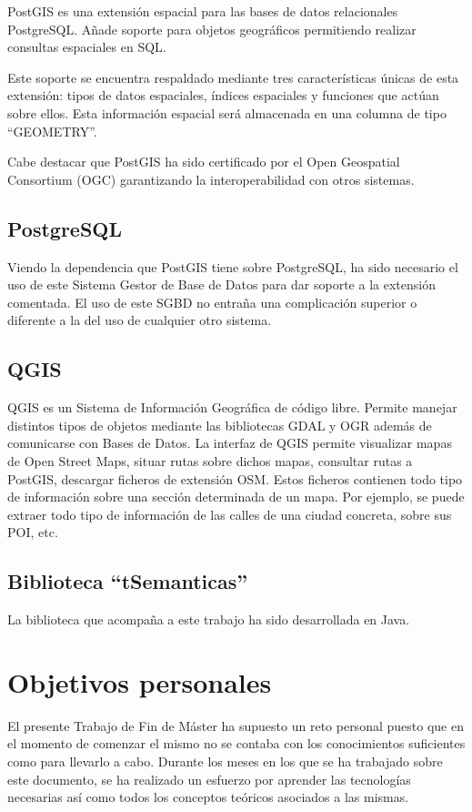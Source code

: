 PostGIS es una extensión espacial para las bases de datos relacionales PostgreSQL. Añade soporte  para objetos geográficos permitiendo realizar consultas espaciales en SQL.

Este soporte se encuentra respaldado mediante tres características únicas de esta extensión: tipos de datos espaciales, índices espaciales y funciones que actúan sobre ellos. Esta información espacial será almacenada en una columna de tipo ``GEOMETRY''.

Cabe destacar que PostGIS ha sido certificado por el Open Geospatial Consortium (OGC) garantizando la interoperabilidad con otros sistemas.


\subsection{PostgreSQL}
Viendo la dependencia que PostGIS tiene sobre PostgreSQL, ha sido necesario el uso de este Sistema Gestor de Base de Datos para dar soporte a la extensión comentada. El uso de este SGBD no entraña una complicación superior o diferente a la del uso de cualquier otro sistema.


\subsection{QGIS}
QGIS es un Sistema de Información Geográfica de código libre. Permite manejar distintos tipos de objetos mediante las bibliotecas GDAL y OGR además de comunicarse con Bases de Datos. La interfaz de QGIS permite visualizar mapas de Open Street Maps, situar rutas sobre dichos mapas, consultar rutas a PostGIS, descargar ficheros de  extensión OSM. Estos ficheros contienen todo tipo de información sobre una sección determinada de un mapa. Por ejemplo, se puede extraer todo tipo de información de las calles de una ciudad concreta, sobre sus POI, etc. 

\subsection{Biblioteca ``tSemanticas''}
La biblioteca que acompaña a este trabajo ha sido desarrollada en Java.

\section{Objetivos personales}

El presente Trabajo de Fin de Máster ha supuesto un reto personal puesto que en el momento de comenzar el mismo no se contaba con los conocimientos suficientes como para llevarlo a cabo. Durante los meses en los que se ha trabajado sobre este documento, se ha realizado un esfuerzo por aprender las tecnologías necesarias así como todos los conceptos teóricos asociados a las mismas.

